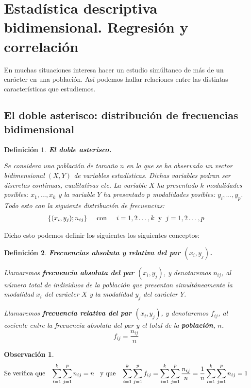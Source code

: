 \documentclass[10pt, a4paper]{article}
\theoremstyle{theorem-style}
\theoremstyle{definition-style}
\newtheorem{ndef}{Definición}[section]
\theoremstyle{remark-style}
\newtheorem*{nota}{Observación}
\theoremstyle{example-style}
\theoremstyle{definition-style}
\theoremstyle{remark-style}
\begin{document}
\section{Estadística descriptiva bidimensional. Regresión y correlación}


En muchas situaciones interesa hacer un estudio simúltaneo de más de un
carácter en una población. Así podemos hallar relaciones entre las distintas
características que estudiemos.

\subsection{El doble asterisco: distribución de frecuencias bidimensional}

\begin{ndef}
\textbf{El doble asterisco.}

Se considera una población de tamaño $n$ en la que se ha observado un vector
bidimensional $(X,Y)$ de variables estadísticas. Dichas variables podran ser
discretas continuas, cualitativas etc. La variable $X$ ha presentado $k$
modalidades posibles: $x_1, \ldots, x_k$ y la variable $Y$ ha
presentado $p$ modalidades posibles: $y_i, \ldots, y_p$. Todo esto con la
siguiente distribución de frecuencias:
$$\{(x_i , y_j); n_{ij}\} \text{\hspace{0.5cm}con\hspace{0.5cm}} i=1,2\dots,k \text{\hspace{0.2cm}y\hspace{0.2cm}} j=1,2\dots,p$$
	
\end{ndef}


Dicho esto podemos definir los siguientes los siguientes conceptos:

\begin{ndef}
\textbf{Frecuencias absoluta y relativa del par $(x_i, y_j)$.}

Llamaremos \textbf{frecuencia absoluta del par $(x_i, y_j)$}, y denotaremos $n_{ij}$, al número total de individuos de la población que presentan simultáneamente la modalidad $x_i$ del carácter $X$ y la modalidad $y_j$ del carácter $Y$.

Llamaremos \textbf{frecuencia relativa del par $(x_i, y_j)$}, y denotaremos $f_{ij}$, al cociente entre la frecuencia absoluta del par y el total de la \textbf{población}, $n$.
 $$ f_{ij} = \frac{n_{ij}}{n} $$
\end{ndef}

\begin{nota}
	$$ \text{Se verifica que \hspace{0.2cm}} \sum_{i=1}^{k} \sum_{j=1}^{p} n_{ij} = n \text{\hspace{0.2cm} y que \hspace{0.2cm}} \sum_{i=1}^{k} \sum_{j=1}^{p} f_{ij} = \sum_{i=1}^{k} \sum_{j=1}^{p}
 \frac{n_{ij}}{n} = \frac{1}{n} \sum_{i=1}^{k} \sum_{j=1}^{p} n_{ij} = 1$$
\end{nota}
\end{document}
